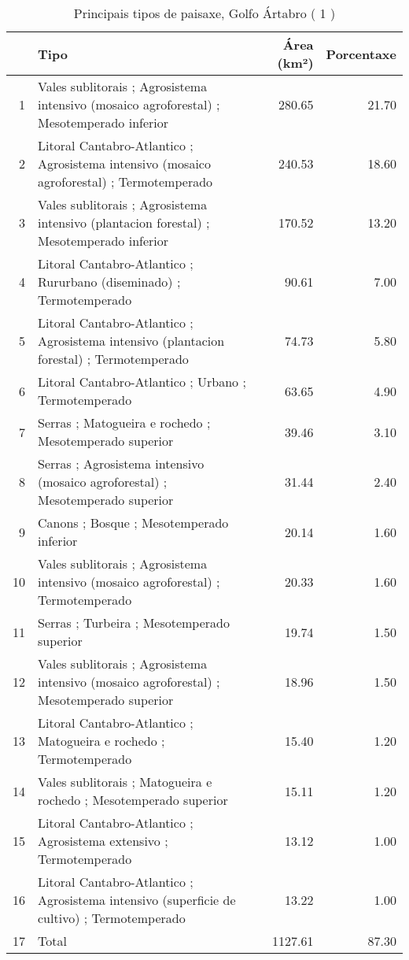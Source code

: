 \begin{table}[p]
\centering
\caption{Principais tipos de paisaxe,  Golfo Ártabro ( 1 )} 
\label{Tipos 1}
\begin{tabular}{rlrr}
  \hline
 & Tipo & Área (km²) & Porcentaxe \\ 
  \hline
1 & Vales sublitorais ; Agrosistema intensivo (mosaico agroforestal) ; Mesotemperado inferior & 280.65 & 21.70 \\ 
  2 & Litoral Cantabro-Atlantico ; Agrosistema intensivo (mosaico agroforestal) ; Termotemperado & 240.53 & 18.60 \\ 
  3 & Vales sublitorais ; Agrosistema intensivo (plantacion forestal) ; Mesotemperado inferior & 170.52 & 13.20 \\ 
  4 & Litoral Cantabro-Atlantico ; Rururbano (diseminado) ; Termotemperado & 90.61 & 7.00 \\ 
  5 & Litoral Cantabro-Atlantico ; Agrosistema intensivo (plantacion forestal) ; Termotemperado & 74.73 & 5.80 \\ 
  6 & Litoral Cantabro-Atlantico ; Urbano ; Termotemperado & 63.65 & 4.90 \\ 
  7 & Serras ; Matogueira e rochedo ; Mesotemperado superior & 39.46 & 3.10 \\ 
  8 & Serras ; Agrosistema intensivo (mosaico agroforestal) ; Mesotemperado superior & 31.44 & 2.40 \\ 
  9 & Canons ; Bosque ; Mesotemperado inferior & 20.14 & 1.60 \\ 
  10 & Vales sublitorais ; Agrosistema intensivo (mosaico agroforestal) ; Termotemperado & 20.33 & 1.60 \\ 
  11 & Serras ; Turbeira ; Mesotemperado superior & 19.74 & 1.50 \\ 
  12 & Vales sublitorais ; Agrosistema intensivo (mosaico agroforestal) ; Mesotemperado superior & 18.96 & 1.50 \\ 
  13 & Litoral Cantabro-Atlantico ; Matogueira e rochedo ; Termotemperado & 15.40 & 1.20 \\ 
  14 & Vales sublitorais ; Matogueira e rochedo ; Mesotemperado superior & 15.11 & 1.20 \\ 
  15 & Litoral Cantabro-Atlantico ; Agrosistema extensivo ; Termotemperado & 13.12 & 1.00 \\ 
  16 & Litoral Cantabro-Atlantico ; Agrosistema intensivo (superficie de cultivo) ; Termotemperado & 13.22 & 1.00 \\ 
  17 & Total & 1127.61 & 87.30 \\ 
   \hline
\end{tabular}
\end{table}
